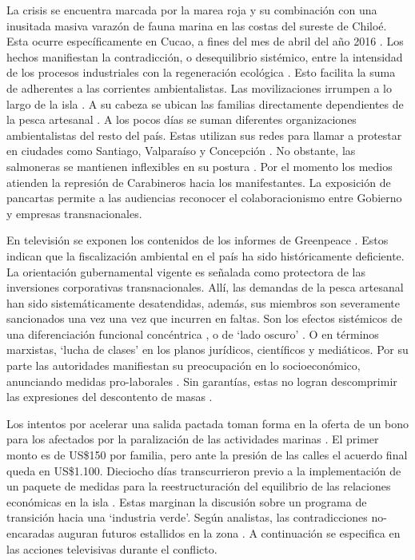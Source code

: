 \documentclass{textolivre}
\begin{document}
La crisis se encuentra marcada por la marea roja y su combinación con una
inusitada masiva varazón de fauna marina en las costas del sureste de Chiloé. Esta
ocurre específicamente en Cucao, a fines del mes de abril del año 2016 \cite{cnnchile2016b}. 
Los hechos manifiestan la contradicción, o desequilibrio sistémico, entre la
intensidad de los procesos industriales con la regeneración ecológica \cite{Folke2016,Foster2016}. 
Esto facilita la suma de adherentes a las corrientes ambientalistas. Las
movilizaciones irrumpen a lo largo de la isla \cite{24horasa}. A su cabeza se ubican
las familias directamente dependientes de la pesca artesanal \cite{cabello2018}. 
A los pocos días se suman diferentes organizaciones ambientalistas
del resto del país. Estas utilizan sus redes para llamar a protestar en ciudades como
Santiago, Valparaíso y Concepción \cite{agenciaefe}. No obstante, las salmoneras
se mantienen inflexibles en su postura \cite{cooperativa2016}. Por el momento los
medios atienden la represión de Carabineros hacia los manifestantes. La exposición de
pancartas permite a las audiencias reconocer el colaboracionismo entre Gobierno y
empresas transnacionales.

En televisión se exponen los contenidos de los informes de Greenpeace \cite{cnnchile2016b}. 
Estos indican que la fiscalización ambiental en el país ha sido
históricamente deficiente. La orientación gubernamental vigente es señalada como
protectora de las inversiones corporativas transnacionales. Allí, las demandas de la pesca
artesanal han sido sistemáticamente desatendidas, además, sus miembros son
severamente sancionados una vez una vez que incurren en faltas. Son los efectos
sistémicos de una diferenciación funcional concéntrica \cite{Mascareo2018}, o de ‘lado
oscuro’ \cite{teubner2012}. O en términos marxistas, ‘lucha de clases’ \cite{marx2003,marx2013} 
en los planos jurídicos, científicos y mediáticos. Por su parte las autoridades
manifiestan su preocupación en lo socioeconómico, anunciando medidas pro-laborales
\cite{t13a}. Sin garantías, estas no logran descomprimir las expresiones del
descontento de masas \cite{infante2016}.

Los intentos por acelerar una salida pactada toman forma en la oferta de un bono
para los afectados por la paralización de las actividades marinas \cite{24horasb}. El
primer monto es de US\$150 por familia, pero ante la presión de las calles el acuerdo final
queda en US\$1.100. Dieciocho días transcurrieron previo a la implementación de un
paquete de medidas para la reestructuración del equilibrio de las relaciones económicas
en la isla \cite{quense}. Estas marginan la discusión sobre un programa de transición
hacia una ‘industria verde’. Según analistas, las contradicciones no-encaradas auguran
futuros estallidos en la zona \cite{rios2016}. A continuación se especifica en las acciones
televisivas durante el conflicto.
\end{document}
